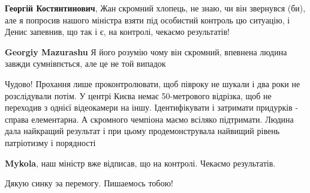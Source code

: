 \begin{itemize}
\begin{itemize}
 
\textbf{Георгій Костянтинович}, Жан скромний хлопець, не знаю, чи він звернувся (би), але я попросив нашого міністра взяти під особистий контроль цю ситуацію, і Денис запевнив, що так і є, на контролі, чекаємо результатів!

 
\textbf{Georgiy Mazurashu} Я його розумію чому він скромний, впевнена людина завжди сумнівпється, але це не той випадок

 

Чудово! Прохання лише проконтролювати, щоб півроку не шукали і два роки не
розслідували потім. У центрі Києва немає 50-метрового відрізка, щоб не
переходив з однієї відеокамери на іншу. Ідентифікувати і затримати придурків -
справа елементарна. А скромного чемпіона маємо всіляко підтримати. Людина дала
найкращий результат і при цьому продемонструвала найвищий рівень патріотизму і
порядності


 
\textbf{Mykola}, наш міністр вже відписав, що на контролі. Чекаємо результатів.

 
Дякую синку эа перемогу. Пишаемось тобою!
\end{itemize}


\end{itemize}
